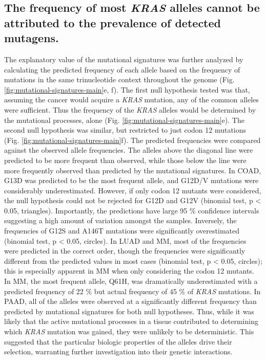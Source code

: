 \documentclass[english, 10pt, letterpaper]{article}
\newcommand{\KRAS}{\emph{KRAS}}
\begin{document}


\subsection*{The frequency of most \KRAS{} alleles cannot be attributed to the prevalence of detected mutagens.}

The explanatory value of the mutational signatures was further analyzed by calculating the predicted frequency of each allele based on the frequency of mutations in the same trinucleotide context throughout the genome (Fig. \ref{fig:mutational-signatures-main}e, f).
The first null hypothesis tested was that, assuming the cancer would acquire a \KRAS{} mutation, any of the common alleles were sufficient. Thus the frequency of the \KRAS{} alleles would be determined by the mutational processes, alone (Fig. \ref{fig:mutational-signatures-main}e).
The second null hypothesis was similar, but restricted to just codon 12 mutations (Fig. \ref{fig:mutational-signatures-main}f).
The predicted frequencies were compared against the observed allele frequencies.
The alleles above the diagonal line were predicted to be more frequent than observed, while those below the line were more frequently observed than predicted by the mutational signatures.
In COAD, G13D was predicted to be the most frequent allele, and G12D/V mutations were considerably underestimated.
However, if only codon 12 mutants were considered, the null hypothesis could not be rejected for G12D and G12V  (binomial test, p < 0.05, triangles).
Importantly, the predictions have large 95 \% confidence intervals suggesting a high amount of variation amongst the samples.
Inversely, the frequencies of G12S and A146T mutations were significantly overestimated (binomial test, p < 0.05, circles).
In LUAD and MM, most of the frequencies were predicted in the correct order, though the frequencies were significantly different from the predicted values in most cases (binomial test, p < 0.05, circles); this is especially apparent in MM when only considering the codon 12 mutants.
In MM, the most frequent allele, Q61H, was dramatically underestimated with a predicted frequency of 22 \% but actual frequency of 45 \% of \KRAS{} mutations.
In PAAD, all of the alleles were observed at a significantly different frequency than predicted by mutational signatures for both null hypotheses.
Thus, while it was likely that the active mutational processes in a tissue contributed to determining which \KRAS{} mutation was gained, they were unlikely to be deterministic.
This suggested that the particular biologic properties of the alleles drive their selection, warranting further investigation into their genetic interactions.
\end{document}
